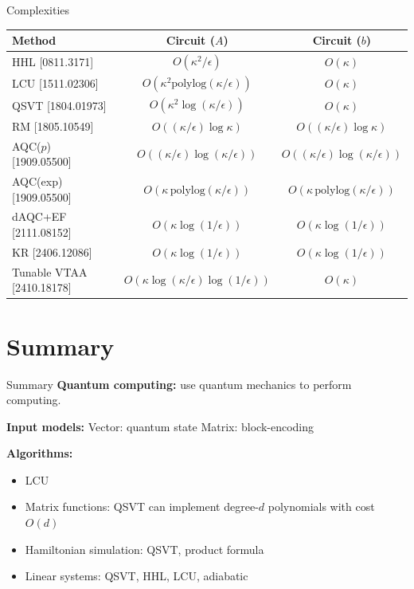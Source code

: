 \documentclass[aspectratio=169]{beamer}
\begin{document}
\begin{frame}{Complexities}
\centering\small
\begin{tabular}{lcc}
\toprule
Method & Circuit ($A$) & Circuit ($b$)\\
\midrule
HHL [0811.3171] & $O(\kappa^2/\epsilon)$ & $O(\kappa)$\\
LCU [1511.02306] & $O(\kappa^2\mathrm{polylog}(\kappa/\epsilon))$ & $O(\kappa)$\\
QSVT [1804.01973] & $O(\kappa^2\log(\kappa/\epsilon))$ & $O(\kappa)$\\
RM [1805.10549] & $O((\kappa/\epsilon)\log\kappa)$ & $O((\kappa/\epsilon)\log\kappa)$\\
AQC($p$) [1909.05500] & $O((\kappa/\epsilon)\log(\kappa/\epsilon))$ & $O((\kappa/\epsilon)\log(\kappa/\epsilon))$\\
AQC(exp) [1909.05500] & $O(\kappa\,\mathrm{polylog}(\kappa/\epsilon))$ & $O(\kappa\,\mathrm{polylog}(\kappa/\epsilon))$\\
dAQC+EF [2111.08152] & $O(\kappa\log(1/\epsilon))$ & $O(\kappa\log(1/\epsilon))$\\
KR [2406.12086] & $O(\kappa\log(1/\epsilon))$ & $O(\kappa\log(1/\epsilon))$\\
Tunable VTAA [2410.18178] & $O(\kappa\log(\kappa/\epsilon)\log(1/\epsilon))$ & $O(\kappa)$\\
\bottomrule
\end{tabular}
\end{frame}

\section{Summary}
\begin{frame}\sectionpage\end{frame}

\begin{frame}{Summary}
\textbf{Quantum computing:} use quantum mechanics to perform computing.

\textbf{Input models:} Vector: quantum state \quad Matrix: block-encoding

\textbf{Algorithms:}
\begin{itemize}
\item LCU
\item Matrix functions: QSVT can implement degree-$d$ polynomials with cost $O(d)$
\item Hamiltonian simulation: QSVT, product formula
\item Linear systems: QSVT, HHL, LCU, adiabatic
\end{itemize}
\end{frame}
\end{document}
